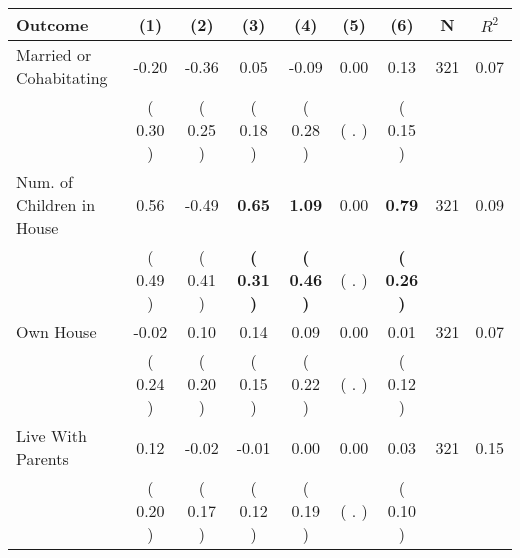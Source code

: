 \begin{tabular}{lcccccccc}
\toprule
 \textbf{Outcome} & \textbf{(1)} & \textbf{(2)} & \textbf{(3)} & \textbf{(4)} & \textbf{(5)} & \textbf{(6)} & \textbf{N} & \textbf{$ R^2$} \\
\midrule
Married or Cohabitating &     -0.20 &     -0.36 &      0.05 &     -0.09 &      0.00 &      0.13 & 321 &       0.07 \\ 
 & (     0.30 ) & (     0.25 ) & (     0.18 ) & (     0.28 ) & (        . ) & (     0.15 ) & \\
Num. of Children in House &      0.56 &     -0.49 & \textbf{     0.65} & \textbf{     1.09} &      0.00 & \textbf{     0.79} & 321 &       0.09 \\ 
 & (     0.49 ) & (     0.41 ) & \textbf{(     0.31 )} & \textbf{(     0.46 )} & (        . ) & \textbf{(     0.26 )} & \\
Own House &     -0.02 &      0.10 &      0.14 &      0.09 &      0.00 &      0.01 & 321 &       0.07 \\ 
 & (     0.24 ) & (     0.20 ) & (     0.15 ) & (     0.22 ) & (        . ) & (     0.12 ) & \\
Live With Parents &      0.12 &     -0.02 &     -0.01 &      0.00 &      0.00 &      0.03 & 321 &       0.15 \\ 
 & (     0.20 ) & (     0.17 ) & (     0.12 ) & (     0.19 ) & (        . ) & (     0.10 ) & \\
\bottomrule
\end{tabular}
